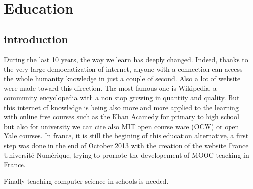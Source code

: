 

\chapter{Education} %


\section{introduction} %
During the last 10 years, the way we learn has deeply changed. Indeed, thanks to the very large democratization of internet, anyone with a connection can access the whole humanity knowledge in just a couple of second. Also a lot of website were made toward this direction. The most famous one is Wikipedia, a community encyclopedia with a non stop growing in quantity and quality. But this internet of knowledge is being also more and more applied to the learning with online free courses such as the Khan Acamedy for primary to high school but also for university we can cite also MIT open course ware (OCW) or open Yale courses.
In france, it is still the begining of this education alternative, a first step was done in the end of October 2013 with the creation of the website France Université Numérique, trying to promote the developement of MOOC teaching in France.

Finally teaching computer science in schools is needed.

